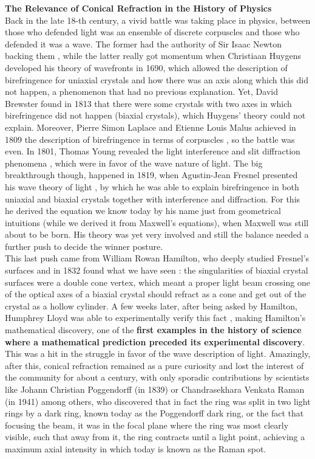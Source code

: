 \documentclass[11pt, a4paper, twoside]{article} %
\DeclareRobustCommand{\mybox}[2][gray!10]{%
\begin{tcolorbox}[   %
        left=0.2cm,
        right=0.2cm,
        top=0.15cm,
        bottom=0.15cm,
        colback=#1,
        colframe=#1,
        width=\dimexpr\textwidth\relax, 
        enlarge left by=0mm,
        boxsep=5pt,
        arc=0pt,outer arc=0pt,
        ]
        #2
\end{tcolorbox}
}
\begin{document}
\mybox{{\bf The Relevance of Conical Refraction in the History of Physics}\vspace{0.2cm}\\
Back in the late 18-th century, a vivid battle was taking place in physics, between those who defended light was an ensemble of discrete corpuscles and those who defended it was a wave. The former had the authority of Sir Isaac Newton backing them \cite{newton}, while the latter really got momentum when Christiaan Huygens developed his theory of wavefronts \cite{huygens} in 1690, which allowed the description of birefringence for uniaxial crystals and how there was an axis along which this did not happen, a phenomenon that had no previous explanation. Yet, David Brewster found in 1813 that there were some crystals with two axes in which birefringence did not happen (biaxial crystals), which Huygens' theory could not explain. Moreover, Pierre Simon Laplace and Etienne Louis Malus achieved in 1809 the description of birefringence in terms of corpuscles \cite{laplace,malus}, so the battle was even. In 1801, Thomas Young revealed the light interference and slit diffraction phenomena \cite{young}, which were in favor of the wave nature of light. The big breakthrough though, happened in 1819, when Agustin-Jean Fresnel presented his wave theory of light \cite{fresnel}, by which he was able to explain birefringence in both uniaxial and biaxial crystals together with interference and diffraction. For this he derived the equation we know today by his name just from geometrical intuitions (while we derived it from Maxwell's equations), when Maxwell was still about to be born. His theory was yet very involved and still the balance needed a further push to decide the winner posture. \\

This last push came from William Rowan Hamilton, who deeply studied Fresnel's surfaces and in 1832 found what we have seen \cite{hamilton}: the singularities of biaxial crystal surfaces were a double cone vertex, which meant a proper light beam crossing one of the optical axes of a biaxial crystal should refract as a cone and get out of the crystal as a hollow cylinder. A few weeks later, after being asked by Hamilton, Humphrey Lloyd was able to experimentally verify this fact \cite{lloyd}, making Hamilton's mathematical discovery, one of the {\bf first examples in the history of science where a mathematical prediction preceded its experimental discovery}. This was a hit in the struggle in favor of the wave description of light. Amazingly, after this, conical refraction remained as a pure curiosity and lost the interest of the community for about a century, with only sporadic contributions by scientists like Johann Christian Poggendorff (in 1839) \cite{poggendorff} or Chandrasekhara Venkata Raman (in 1941) \cite{raman1,raman2} among others, who discovered that in fact the ring was split in two light rings by a dark ring, known today as the Poggendorff dark ring, or the fact that focusing the beam, it was in the focal plane where the ring was most clearly visible, such that away from it, the ring contracts until a light point, achieving a maximum axial intensity in which today is known as the Raman spot.\\ 

}
\end{document}
